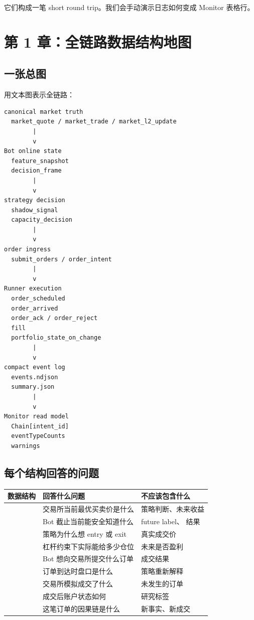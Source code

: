 \documentclass[11pt,a4paper]{ctexart}
\newcommand{\code}[1]{\texttt{\detokenize{#1}}}
\begin{document}
它们构成一笔 short round trip。我们会手动演示日志如何变成 Monitor 表格行。

\section{第 1 章：全链路数据结构地图}

\subsection{一张总图}

用文本图表示全链路：

\begin{lstlisting}
canonical market truth
  market_quote / market_trade / market_l2_update
        |
        v
Bot online state
  feature_snapshot
  decision_frame
        |
        v
strategy decision
  shadow_signal
  capacity_decision
        |
        v
order ingress
  submit_orders / order_intent
        |
        v
Runner execution
  order_scheduled
  order_arrived
  order_ack / order_reject
  fill
  portfolio_state_on_change
        |
        v
compact event log
  events.ndjson
  summary.json
        |
        v
Monitor read model
  Chain[intent_id]
  eventTypeCounts
  warnings
\end{lstlisting}

\subsection{每个结构回答的问题}

\begin{longtable}{p{}p{}p{}}
\toprule
数据结构 & 回答什么问题 & 不应该包含什么 \\
\midrule
\code{market_quote} & 交易所当前最优买卖价是什么 & 策略判断、未来收益 \\
\code{feature_snapshot} & Bot 截止当前能安全知道什么 & future label、\code{date/} 结果 \\
\code{shadow_signal} & 策略为什么想 entry 或 exit & 真实成交价 \\
\code{capacity_decision} & 杠杆约束下实际能给多少仓位 & 未来是否盈利 \\
\code{order_intent} & Bot 想向交易所提交什么订单 & 成交结果 \\
\code{order_arrived} & 订单到达时盘口是什么 & 策略重新解释 \\
\code{fill} & 交易所模拟成交了什么 & 未发生的订单 \\
\code{portfolio_state} & 成交后账户状态如何 & 研究标签 \\
\code{monitor chain} & 这笔订单的因果链是什么 & 新事实、新成交 \\
\bottomrule
\end{longtable}
\end{document}
